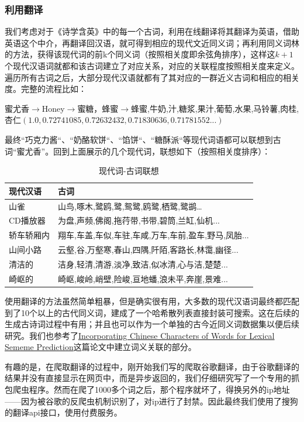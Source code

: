 \documentclass[a4paper, 10pt]{article}
\begin{document}
\subsubsection*{利用翻译}
我们考虑对于《诗学含英》中的每一个古词，利用在线翻译将其翻译为英语，借助英语这个中介，再翻译回汉语，就可得到相应的现代文近同义词；再利用同义词林的方法，获得该现代词的前k个同义词（按照相关度即余弦角排序），这样这$k+1$个现代汉语词就都和该古词建立了对应关系，对应的关联程度按照相关度来定义。遍历所有古词之后，大部分现代汉语就都有了其对应的一群近义古词和相应的相关度。完整的流程比如：

蜜尤香$\rightarrow$Honey$\rightarrow$蜜糖，蜂蜜$\rightarrow$蜂蜜,牛奶,汁,糖浆,果汁,葡萄,水果,马铃薯,肉桂, 杏仁$(1.0,0.72741085, 0.72632432, 0.71830636, 0.71781552...)$

最终“巧克力酱“、“奶酪软饼“、“馅饼“、“糖酥派“等现代词语都可以联想到古词“蜜尤香”。回到上面展示的几个现代词，联想如下（按照相关度排序）：

\begin{table}[H]
  \centering
  \caption{现代词-古词联想}
    \begin{tabular}{|l|l|}
    \hline
    现代汉语  & 古词 \\
    \hline
    山雀    & 山鸟,啄木,鹭鸥,鹭,鸳鹭,鸥鹭,栖鹭,鹭鹚… \\
    \hline
    CD播放器 & 为盘,声频,佛阁,拖荇带,书带,碧筒,兰缸,仙机... \\
    \hline
    轿车轿厢内 & 翔车,车盖,车似,车驻,车咸,万车,车前,盈车,野马,凤胎... \\
    \hline
    山间小路  & 云壑,谷,万壑寒,春山,四隅,阡陌,客路长,林霭,幽径... \\
    \hline
    清洁的   & 洁身,轻清,清游,淡净,致洁,似冰清,心与洁,楚楚... \\
    \hline
    崎岖的   & 崎岖,峻岭,峭壁,险峻,亘地蟠,浪未平,奔崖,景难... \\
    \hline
    \end{tabular}%
  \label{tab:addlabel}%
\end{table}%


使用翻译的方法虽然简单粗暴，但是确实很有用，大多数的现代汉语词最终都匹配到了10个以上的古代同义词，建成了一个哈希散列表直接封装可搜索。这在后续的生成古诗词过程中有用；并且也可以作为一个单独的古今近同义词数据集以便后续研究。我们也参考了\href{https://arxiv.org/abs/1806.06349}{Incorporating Chinese Characters of Words for Lexical Sememe Prediction}这篇论文中建立词义关联的部分。

有趣的是，在爬取翻译的过程中，刚开始我们写的爬取谷歌翻译，由于谷歌翻译的结果并没有直接显示在网页中，而是异步返回的，我们仔细研究写了一个专用的抓包爬虫程序。然而在爬了1000多个词之后，那个程序就坏了，得换另外的ip地址——因为被谷歌的反爬虫机制识别了，对ip进行了封禁。因此最终我们使用了搜狗的翻译api接口，使用付费服务。
\end{document}
